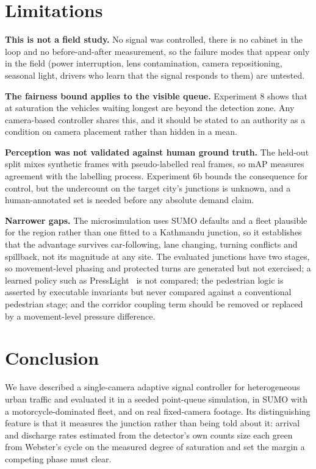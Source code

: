 \documentclass[journal]{IEEEtran}
\begin{document}
\section{Limitations}
\label{sec:limitations}

\textbf{This is not a field study.} No signal was controlled, there is no cabinet in the loop and no
before-and-after measurement, so the failure modes that appear only in the field (power interruption, lens contamination, camera
repositioning, seasonal light, drivers who learn that the signal responds to them) are untested.

\textbf{The fairness bound applies to the visible queue.} Experiment 8 shows that at saturation the vehicles
waiting longest are beyond the detection zone. Any camera-based controller shares this, and it should be
stated to an authority as a condition on camera placement rather than hidden in a mean.

\textbf{Perception was not validated against human ground truth.} The held-out split mixes synthetic frames
with pseudo-labelled real frames, so mAP measures agreement with the labelling process. Experiment 6b bounds
the consequence for control, but the undercount on the target city's junctions is unknown, and a
human-annotated set is needed before any absolute demand claim.

\textbf{Narrower gaps.} The microsimulation uses SUMO defaults and a fleet plausible for the region rather
than one fitted to a Kathmandu junction, so it establishes that the advantage survives car-following, lane
changing, turning conflicts and spillback, not its magnitude at any site. The evaluated junctions have two
stages, so movement-level phasing and protected turns are generated but not exercised; a learned policy such
as PressLight~\cite{wei2019presslight} is not compared; the pedestrian logic is asserted by executable
invariants but never compared against a conventional pedestrian stage; and the corridor coupling term should
be removed or replaced by a movement-level pressure difference.

\section{Conclusion}

We have described a single-camera adaptive signal controller for heterogeneous urban traffic and evaluated it
in a seeded point-queue simulation, in SUMO with a motorcycle-dominated fleet, and on real fixed-camera
footage. Its distinguishing feature is that it measures the junction rather than being told about it:
arrival and discharge rates estimated from the detector's own counts size each green from Webster's cycle on
the measured degree of saturation and set the margin a competing phase must clear.
\end{document}
